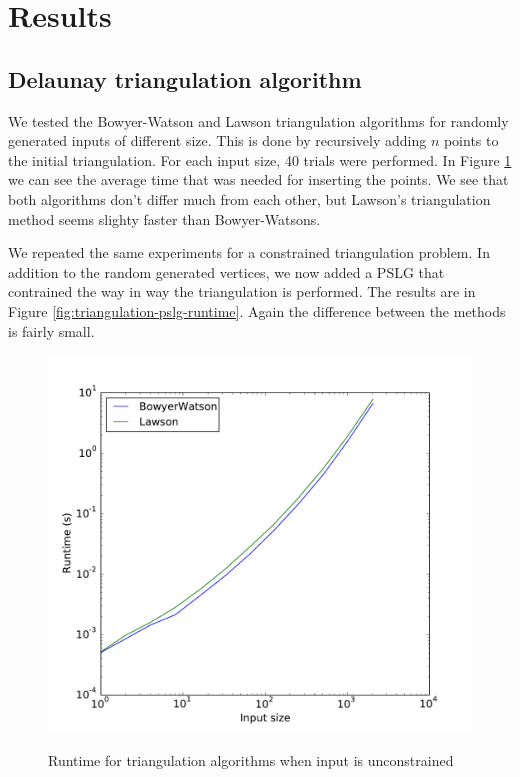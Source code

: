 \section{Results}
\label{sec:results}

\subsection{Delaunay triangulation algorithm}
\label{sub:results:triangulation}

We tested the Bowyer-Watson and Lawson triangulation algorithms for randomly generated inputs of different size.
This is done by recursively adding $n$ points to the initial triangulation.
For each input size, 40 trials were performed.
In Figure \ref{fig:triangulation-runtime} we can see the average time that was needed for inserting the points.
We see that both algorithms don't differ much from each other, but Lawson's triangulation method seems slighty faster than Bowyer-Watsons.

We repeated the same experiments for a constrained triangulation problem.
In addition to the random generated vertices, we now added a PSLG that contrained the way in way the triangulation is performed.
The results are in Figure \ref{fig:triangulation-pslg-runtime}.
Again the difference between the methods is fairly small.

\begin{figure}[ht]
    \centering
    \includegraphics[width=\columnwidth]{../images/runtime.pdf}
    \label{fig:triangulation-runtime}
    \caption{Runtime for triangulation algorithms when input is unconstrained}
\end{figure}

